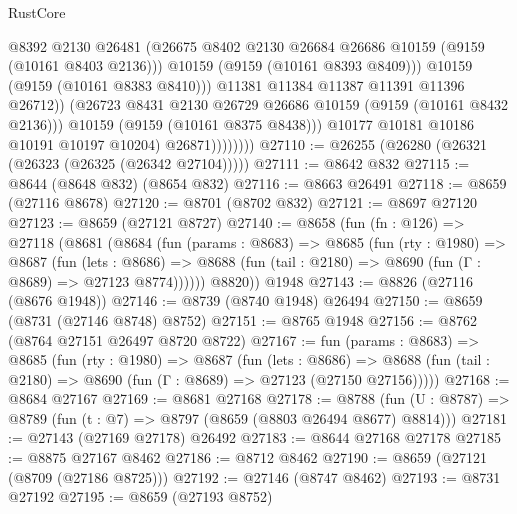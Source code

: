 \begin{lexlean}{RustCore}
\begin{coremodule}
                                @8392
                                @2130
                                @26481
                                (@26675
                                  @8402
                                  @2130
                                  @26684
                                  @26686
                                  @10159
                                  (@9159 (@10161 @8403 @2136)))
                                @10159
                                (@9159 (@10161 @8393 @8409)))
                              @10159
                              (@9159 (@10161 @8383 @8410)))
                            @11381
                            @11384
                            @11387
                            @11391
                            @11396
                            @26712))
                        (@26723 @8431 @2130 @26729 @26686 @10159 (@9159 (@10161 @8432 @2136)))
                        @10159
                        (@9159 (@10161 @8375 @8438)))
                      @10177
                      @10181
                      @10186
                      @10191
                      @10197
                      @10204)
                    @26871))))))))
@27110 := @26255 (@26280 (@26321 (@26323 (@26325 (@26342 @27104)))))
@27111 := @8642 @832
@27115 := @8644 (@8648 @832) (@8654 @832)
@27116 := @8663 @26491
@27118 := @8659 (@27116 @8678)
@27120 := @8701 (@8702 @832)
@27121 := @8697 @27120
@27123 := @8659 (@27121 @8727)
@27140 := @8658
    (fun (fn : @126) =>
    @27118
      (@8681
        (@8684
          (fun (params : @8683) =>
          @8685
            (fun (rty : @1980) =>
            @8687
              (fun (lets : @8686) =>
              @8688 (fun (tail : @2180) => @8690 (fun (Γ : @8689) => @27123 @8774))))))
        @8820))
    @1948
@27143 := @8826 (@27116 (@8676 @1948))
@27146 := @8739 (@8740 @1948) @26494
@27150 := @8659 (@8731 (@27146 @8748) @8752)
@27151 := @8765 @1948
@27156 := @8762 (@8764 @27151 @26497 @8720 @8722)
@27167 := fun (params : @8683) =>
  @8685
    (fun (rty : @1980) =>
    @8687
      (fun (lets : @8686) =>
      @8688 (fun (tail : @2180) => @8690 (fun (Γ : @8689) => @27123 (@27150 @27156)))))
@27168 := @8684 @27167
@27169 := @8681 @27168
@27178 := @8788
    (fun (U : @8787) => @8789 (fun (t : @7) => @8797 (@8659 (@8803 @26494 @8677) @8814)))
@27181 := @27143 (@27169 @27178) @26492
@27183 := @8644 @27168 @27178
@27185 := @8875 @27167 @8462
@27186 := @8712 @8462
@27190 := @8659 (@27121 (@8709 (@27186 @8725)))
@27192 := @27146 (@8747 @8462)
@27193 := @8731 @27192
@27195 := @8659 (@27193 @8752)

\end{coremodule}
\end{lexlean}
